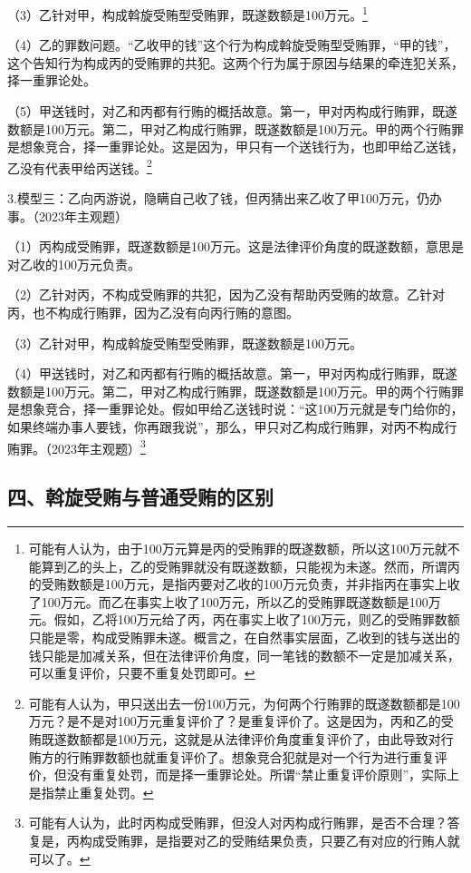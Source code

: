 （3）乙针对甲，构成斡旋受贿型受贿罪，既遂数额是100万元。\footnote{可能有人认为，由于100万元算是丙的受贿罪的既遂数额，所以这100万元就不能算到乙的头上，乙的受贿罪就没有既遂数额，只能视为未遂。然而，所谓丙的受贿数额是100万元，是指丙要对乙收的100万元负责，并非指丙在事实上收了100万元。而乙在事实上收了100万元，所以乙的受贿罪既遂数额是100万元。假如，乙将100万元给了丙，丙在事实上收了100万元，则乙的受贿罪数额只能是零，构成受贿罪未遂。概言之，在自然事实层面，乙收到的钱与送出的钱只能是加减关系，但在法律评价角度，同一笔钱的数额不一定是加减关系，可以重复评价，只要不重复处罚即可。}

（4）乙的罪数问题。“乙收甲的钱”这个行为构成斡旋受贿型受贿罪，“甲的钱”，这个告知行为构成丙的受贿罪的共犯。这两个行为属于原因与结果的牵连犯关系，择一重罪论处。

（5）甲送钱时，对乙和丙都有行贿的概括故意。第一，甲对丙构成行贿罪，既遂数额是100万元。第二，甲对乙构成行贿罪，既遂数额是100万元。甲的两个行贿罪是想象竞合，择一重罪论处。这是因为，甲只有一个送钱行为，也即甲给乙送钱，乙没有代表甲给丙送钱。\footnote{可能有人认为，甲只送出去一份100万元，为何两个行贿罪的既遂数额都是100万元？是不是对100万元重复评价了？是重复评价了。这是因为，丙和乙的受贿既遂数额都是100万元，这就是从法律评价角度重复评价了，由此导致对行贿方的行贿罪数额也就重复评价了。想象竞合犯就是对一个行为进行重复评价，但没有重复处罚，而是择一重罪论处。所谓“禁止重复评价原则”，实际上是指禁止重复处罚。}

3.模型三：乙向丙游说，隐瞒自己收了钱，但丙猜出来乙收了甲100万元，仍办事。（2023年主观题）

（1）丙构成受贿罪，既遂数额是100万元。这是法律评价角度的既遂数额，意思是对乙收的100万元负责。

（2）乙针对丙，不构成受贿罪的共犯，因为乙没有帮助丙受贿的故意。乙针对丙，也不构成行贿罪，因为乙没有向丙行贿的意图。

（3）乙针对甲，构成斡旋受贿型受贿罪，既遂数额是100万元。

（4）甲送钱时，对乙和丙都有行贿的概括故意。第一，甲对丙构成行贿罪，既遂数额是100万元。第二，甲对乙构成行贿罪，既遂数额是100万元。甲的两个行贿罪是想象竞合，择一重罪论处。假如甲给乙送钱时说：“这100万元就是专门给你的，如果终端办事人要钱，你再跟我说”，那么，甲只对乙构成行贿罪，对丙不构成行贿罪。（2023年主观题）\footnote{可能有人认为，此时丙构成受贿罪，但没人对丙构成行贿罪，是否不合理？答复是，丙构成受贿罪，是指要对乙的受贿结果负责，只要乙有对应的行贿人就可以了。}

\subsection*{四、斡旋受贿与普通受贿的区别}

